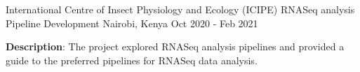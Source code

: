 \begin{cventries}
  \cventry
    {International Centre of Insect Physiology and Ecology (ICIPE)} %
    {RNASeq analysis Pipeline Development} %
    {Nairobi, Kenya} %
    {Oct 2020 - Feb 2021} %
    {
      \begin{cvitems} %
        \item \textbf{Description}: The project explored RNASeq analysis pipelines and provided a guide to the preferred pipelines for RNASeq data analysis.
      \end{cvitems}
    }

\end{cventries}
